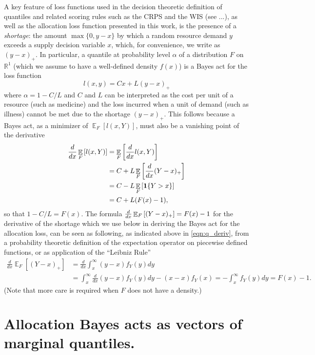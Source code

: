 \documentclass{article}
\DeclareMathOperator{\Ex}{\mathbb{E}}
\begin{document}
A key feature of loss functions used in the decision theoretic definition of quantiles and related scoring rules such as the 
CRPS and the WIS (see ...), as well as the allocation loss function presented in this work, is the presence of a \emph{shortage}: 
the amount $\max\{0,y-x\}$ by which a random resource demand 
$y$ exceeds a supply decision variable $x$, which, for convenience, we write as $(y-x)_{+}$. In particular, a quantile at 
probability level $\alpha$ of a distribution $F$ on $\mathbb{R}^1$ (which we assume to have a well-defined density $f(x)$) 
is a Bayes act for the loss function
\[
l(x,y) = Cx + L(y-x)_{+}
\] 
where $\alpha = 1-C/L$ and $C$ and $L$ can be interpreted as the cost per unit of a resource (such as medicine) and the loss
incurred when a unit of demand (such as illness) cannot be met due to the shortage $(y-x)_{+}$.  This follows because a 
Bayes act, as a minimizer of $\Ex_F[l(x,Y)]$, must also be a vanishing point of the derivative
\begin{align}
\dby{}{x} \Ex_F\left[l(x,Y)\right] &= \Ex_F\left[\dby{}{x}l(x,Y)\right] \nonumber\\
&= C + L\Ex_F\left[\dby{}{x}(Y-x)_+\right] \nonumber\\
&= C - L\Ex_F\left[\mathbf{1}\{Y > x\}\right] \nonumber\\
&= C + L(F(x) - 1), \label{eqn:q_deriv}
\end{align}
so that $1-C/L = F(x)$.
The formula $\dby{}{x}\Ex_F\left[(Y-x)_+\right] = F(x) - 1$ for the derivative of the shortage 
which we use below in deriving the Bayes act for the allocation
loss, can be seen as following, as indicated above in \eqref{eqn:q_deriv}, from a probability theoretic definition of the expectation operator on piecewise defined functions, or as application of the ``Leibniz Rule''
\begin{align}
	\frac{d}{dx} \Ex_F [(Y-x)_{+}] &= \frac{d}{dx} \int_{x}^{\infty} (y-x) f_Y(y)dy \nonumber\\
	&= \int_{x}^{\infty} \frac{d}{dx}(y-x) f_Y(y)dy - (x-x) f_Y(x) = -\int_{x}^{\infty} f_Y(y)dy = F(x)-1. \label{eqn:shortage_deriv}
\end{align}
(Note that more care is required when $F$ does not have a density.) 


\section{Allocation Bayes acts as vectors of marginal quantiles.}
\label{sec:bayes-quantiles}
\end{document}
